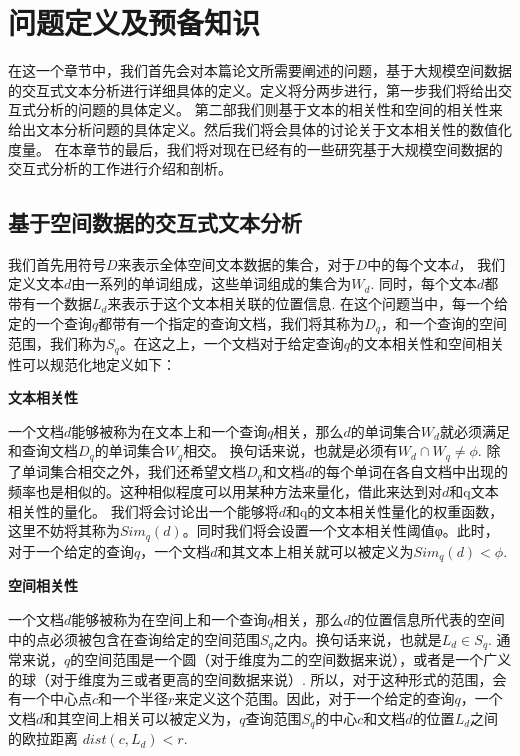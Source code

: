 \chapter{问题定义及预备知识}
\label{cha:china}

在这一个章节中，我们首先会对本篇论文所需要阐述的问题，基于大规模空间数据的交互式文本分析进行详细具体的定义。定义将分两步进行，第一步我们将给出交互式分析的问题的具体定义。 第二部我们则基于文本的相关性和空间的相关性来给出文本分析问题的具体定义。然后我们将会具体的讨论关于文本相关性的数值化度量。 在本章节的最后，我们将对现在已经有的一些研究基于大规模空间数据的交互式分析的工作进行介绍和剖析。

\section{基于空间数据的交互式文本分析}
\label{sec:other}

我们首先用符号$D$来表示全体空间文本数据的集合，对于$D$中的每个文本$d$， 我们定义文本$d$由一系列的单词组成，这些单词组成的集合为$W_d$.  同时，每个文本$d$都带有一个数据$L_d$来表示于这个文本相关联的位置信息. 在这个问题当中，每一个给定的一个查询$q$都带有一个指定的查询文档，我们将其称为$D_q$，和一个查询的空间范围，我们称为$S_q$。在这之上，一个文档对于给定查询$q$的文本相关性和空间相关性可以规范化地定义如下：

\begin{definition}
	{\bf 文本相关性}
	
	一个文档$d$能够被称为在文本上和一个查询$q$相关，那么$d$的单词集合$W_d$就必须满足和查询文档$D_q$的单词集合$W_q$相交。 换句话来说，也就是必须有$W_d \cap W_q \ne \phi$. 除了单词集合相交之外，我们还希望文档$D_q$和文档$d$的每个单词在各自文档中出现的频率也是相似的。这种相似程度可以用某种方法来量化，借此来达到对$d$和q文本相关性的量化。 我们将会讨论出一个能够将$d$和q的文本相关性量化的权重函数，这里不妨将其称为$Sim_q(d)$。同时我们将会设置一个文本相关性阈值φ。此时，对于一个给定的查询$q$，一个文档$d$和其文本上相关就可以被定义为$Sim_q(d) < \phi$.
	
\end{definition}

\begin{definition}
	{\bf 空间相关性}
	
	一个文档$d$能够被称为在空间上和一个查询$q$相关，那么$d$的位置信息所代表的空间中的点必须被包含在查询给定的空间范围$S_q$之内。换句话来说，也就是$L_d \in S_q$. 通常来说，$q$的空间范围是一个圆（对于维度为二的空间数据来说），或者是一个广义的球（对于维度为三或者更高的空间数据来说）. 所以，对于这种形式的范围，会有一个中心点$c$和一个半径$r$来定义这个范围。因此，对于一个给定的查询$q$，一个文档$d$和其空间上相关可以被定义为，$q$查询范围$S_q$的中心$c$和文档$d$的位置$L_d$之间的欧拉距离 $dist(c, L_d) < r$.
	
\end{definition}

